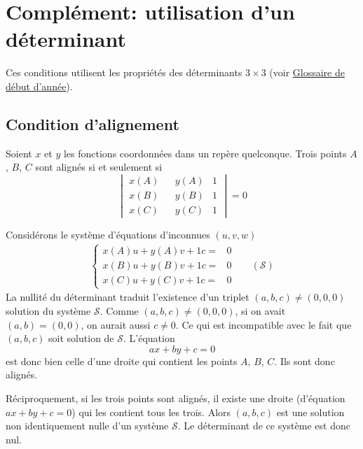 \section{Complément: utilisation d'un déterminant}
Ces conditions utilisent les propriétés des déterminants $3\times3$ (voir \href{\baseurl C4199.pdf}{Glossaire de début d'année}).
\subsection{Condition d'alignement}
\begin{prop}
 Soient $x$ et $y$ les fonctions coordonnées dans un repère quelconque. Trois points $A$, $B$, $C$ sont alignés si et seulement si
\begin{displaymath}
 \begin{vmatrix}
  x(A) & &y(A) & 1 \\
x(B) & & y(B) & 1 \\
x(C) & & y(C) & 1 
 \end{vmatrix}
=0
\end{displaymath}
\end{prop}
\begin{demo}
Considérons le système d'équations d'inconnues $(u,v,w)$
\begin{align*}
 \left\lbrace 
\begin{aligned}
 x(A)u+ y(A)v + 1c =& 0\\ 
x(B)u+ y(B)v + 1c =& 0\\
x(C)u+ y(C)v + 1c =& 0
\end{aligned}
\right. & & (\mathcal S)
\end{align*}
La nullité du déterminant traduit l'existence d'un triplet $(a,b,c)\neq(0,0,0)$ solution du système $\mathcal S$.\newline
Comme $(a,b,c)\neq(0,0,0)$, si on avait $(a,b)=(0,0)$, on aurait aussi $c\neq0$. Ce qui est incompatible avec le fait que $(a,b,c)$ soit solution de $\mathcal S$. L'équation
\begin{displaymath}
 ax+by+c = 0
\end{displaymath}
 est donc bien celle d'une droite qui contient les points $A$, $B$, $C$. Ils sont donc alignés.

Réciproquement, si les trois points sont alignés, il existe une droite (d'équation $ax+by+c = 0$) qui les contient tous les trois. Alors $(a,b,c)$ est une solution non identiquement nulle  d'un système $\mathcal S$. Le déterminant de ce système est donc nul.
\end{demo}

